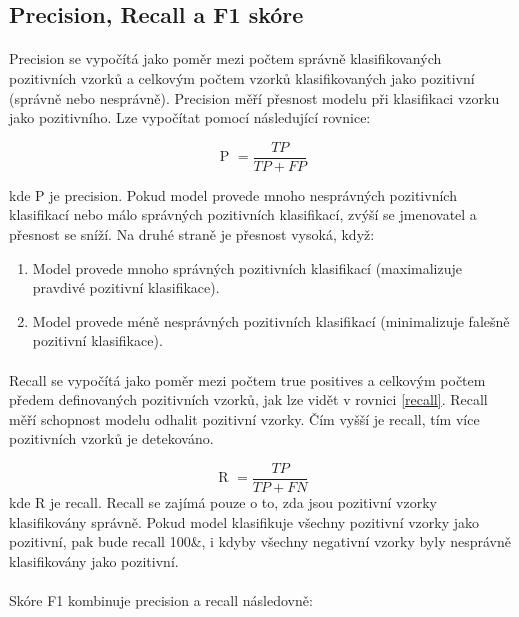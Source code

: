 \subsection*{Precision, Recall a F1 skóre}
\label{prf}

\paragraph{} Precision \cite{precision_recall} se vypočítá jako poměr mezi počtem správně klasifikovaných pozitivních vzorků a celkovým počtem vzorků klasifikovaných jako pozitivní (správně nebo nesprávně). Precision měří přesnost modelu při klasifikaci vzorku jako pozitivního. Lze vypočítat pomocí následující rovnice:

\begin{equation}
\text { P }=\frac{T P}{T P+F P}
\end{equation}

kde P je precision. Pokud model provede mnoho nesprávných pozitivních klasifikací nebo málo správných pozitivních klasifikací, zvýší se jmenovatel a přesnost se sníží. Na druhé straně je přesnost vysoká, když:
\begin{enumerate}
    \item Model provede mnoho správných pozitivních klasifikací (maximalizuje pravdivé pozitivní klasifikace).
    \item Model provede méně nesprávných pozitivních klasifikací (minimalizuje falešně pozitivní klasifikace).
\end{enumerate}


\paragraph{} Recall \cite{precision_recall} se vypočítá jako poměr mezi počtem true positives a celkovým počtem předem definovaných pozitivních vzorků, jak lze vidět v rovnici \ref{recall}. Recall měří schopnost modelu odhalit pozitivní vzorky. Čím vyšší je recall, tím více pozitivních vzorků je detekováno.

\begin{equation}\label{recall}
\text { R }=\frac{T P}{T P+F N}
\end{equation}
kde R je recall. Recall se zajímá pouze o to, zda jsou pozitivní vzorky klasifikovány správně. Pokud model klasifikuje všechny pozitivní vzorky jako pozitivní, pak bude recall 100\&, i kdyby všechny negativní vzorky byly nesprávně klasifikovány jako pozitivní.
\paragraph{} Skóre F1 \cite{precision_recall} kombinuje precision a recall následovně:

